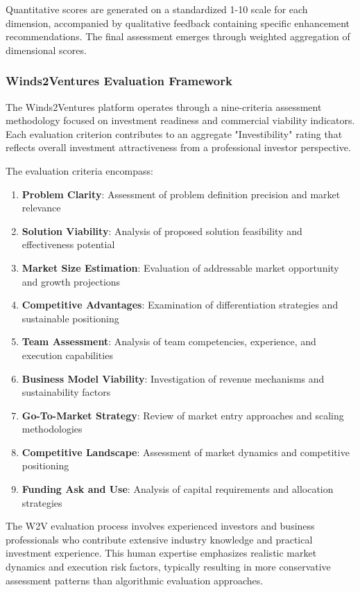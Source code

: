 Quantitative scores are generated on a standardized 1-10 scale for each dimension, accompanied by qualitative feedback containing specific enhancement recommendations. The final assessment emerges through weighted aggregation of dimensional scores.

\subsubsection{Winds2Ventures Evaluation Framework}

The Winds2Ventures platform operates through a nine-criteria assessment methodology focused on investment readiness and commercial viability indicators. Each evaluation criterion contributes to an aggregate "Investibility" rating that reflects overall investment attractiveness from a professional investor perspective.

The evaluation criteria encompass:
\begin{enumerate}
    \item \textbf{Problem Clarity}: Assessment of problem definition precision and market relevance
    \item \textbf{Solution Viability}: Analysis of proposed solution feasibility and effectiveness potential
    \item \textbf{Market Size Estimation}: Evaluation of addressable market opportunity and growth projections
    \item \textbf{Competitive Advantages}: Examination of differentiation strategies and sustainable positioning
    \item \textbf{Team Assessment}: Analysis of team competencies, experience, and execution capabilities
    \item \textbf{Business Model Viability}: Investigation of revenue mechanisms and sustainability factors
    \item \textbf{Go-To-Market Strategy}: Review of market entry approaches and scaling methodologies
    \item \textbf{Competitive Landscape}: Assessment of market dynamics and competitive positioning
    \item \textbf{Funding Ask and Use}: Analysis of capital requirements and allocation strategies
\end{enumerate}

The W2V evaluation process involves experienced investors and business professionals who contribute extensive industry knowledge and practical investment experience. This human expertise emphasizes realistic market dynamics and execution risk factors, typically resulting in more conservative assessment patterns than algorithmic evaluation approaches.

